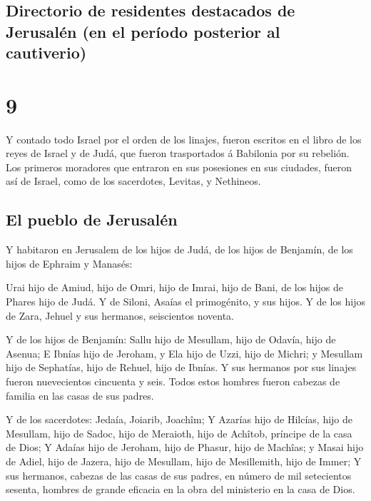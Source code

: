 \hypertarget{directorio-de-residentes-destacados-de-jerusaluxe9n-en-el-peruxedodo-posterior-al-cautiverio}{%
\subsection{Directorio de residentes destacados de Jerusalén (en el
período posterior al
cautiverio)}\label{directorio-de-residentes-destacados-de-jerusaluxe9n-en-el-peruxedodo-posterior-al-cautiverio}}

\hypertarget{section-13-9}{%
\section{9}\label{section-13-9}}

 Y contado todo Israel por el orden de los linajes, fueron
escritos en el libro de los reyes de Israel y de Judá, que fueron
trasportados á Babilonia por su rebelión.  Los primeros
moradores que entraron en sus posesiones en sus ciudades, fueron así de
Israel, como de los sacerdotes, Levitas, y Nethineos.

\hypertarget{el-pueblo-de-jerusaluxe9n}{%
\subsection{El pueblo de Jerusalén}\label{el-pueblo-de-jerusaluxe9n}}

 Y habitaron en Jerusalem de los hijos de Judá, de los
hijos de Benjamín, de los hijos de Ephraim y Manasés:

 Urai hijo de Amiud, hijo de Omri, hijo de Imrai, hijo de
Bani, de los hijos de Phares hijo de Judá.  Y de Siloni,
Asaías el primogénito, y sus hijos.  Y de los hijos de
Zara, Jehuel y sus hermanos, seiscientos noventa.

 Y de los hijos de Benjamín: Sallu hijo de Mesullam, hijo
de Odavía, hijo de Asenua;  E Ibnías hijo de Jeroham, y
Ela hijo de Uzzi, hijo de Michri; y Mesullam hijo de Sephatías, hijo de
Rehuel, hijo de Ibnías.  Y sus hermanos por sus linajes
fueron nuevecientos cincuenta y seis. Todos estos hombres fueron cabezas
de familia en las casas de sus padres.

 Y de los sacerdotes: Jedaía, Joiarib, Joachîm;
 Y Azarías hijo de Hilcías, hijo de Mesullam, hijo de
Sadoc, hijo de Meraioth, hijo de Achîtob, príncipe de la casa de Dios;
 Y Adaías hijo de Jeroham, hijo de Phasur, hijo de
Machîas; y Masai hijo de Adiel, hijo de Jazera, hijo de Mesullam, hijo
de Mesillemith, hijo de Immer;  Y sus hermanos, cabezas
de las casas de sus padres, en número de mil setecientos sesenta,
hombres de grande eficacia en la obra del ministerio en la casa de Dios.

